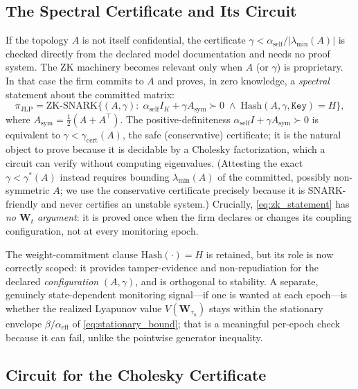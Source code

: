 \documentclass[12pt]{article}
\theoremstyle{plain}
\theoremstyle{definition}
\newcommand{\W}{\mathbf{W}}
\newcommand{\abs}[1]{\left| #1 \right|}
\begin{document}
\subsection{The Spectral Certificate and Its Circuit}

If the topology $A$ is not itself confidential, the certificate
$\gamma<\alpha_{\mathrm{self}}/\abs{\lambda_{\min}(A)}$ is checked directly
from the declared model documentation and needs no proof system.  The ZK
machinery becomes relevant only when $A$ (or $\gamma$) is proprietary.  In
that case the firm commits to $A$ and proves, in zero knowledge, a
\emph{spectral} statement about the committed matrix:
\begin{equation}
  \pi_{\mathrm{JLP}} = \mathrm{ZK\text{-}SNARK}\bigl\{
    (A,\gamma) :\;
    \alpha_{\mathrm{self}} I_K + \gamma A_{\mathrm{sym}} \succ 0
    \;\wedge\;
    \mathrm{Hash}(A,\gamma,\mathtt{Key}) = H
  \bigr\},
  \label{eq:zk_statement}
\end{equation}
where $A_{\mathrm{sym}}=\tfrac12(A+A^\top)$.  The positive-definiteness
$\alpha_{\mathrm{self}} I + \gamma A_{\mathrm{sym}}\succ0$ is equivalent to
$\gamma<\gamma_{\mathrm{cert}}(A)$, the safe (conservative) certificate; it
is the natural object to prove because it is decidable by a Cholesky
factorization, which a circuit can verify without computing eigenvalues.
(Attesting the exact $\gamma<\gamma^*(A)$ instead requires bounding
$\lambda_{\min}(A)$ of the committed, possibly non-symmetric $A$; we use the
conservative certificate precisely because it is SNARK-friendly and never
certifies an unstable system.)  Crucially, \eqref{eq:zk_statement} has
\emph{no $\W_t$ argument}: it is proved once when the firm declares or
changes its coupling configuration, not at every monitoring epoch.

The weight-commitment clause $\mathrm{Hash}(\cdot)=H$ is retained, but its
role is now correctly scoped: it provides tamper-evidence and
non-repudiation for the declared \emph{configuration} $(A,\gamma)$, and is
orthogonal to stability.  A separate, genuinely state-dependent monitoring
signal---if one is wanted at each epoch---is whether the realized Lyapunov
value $V(\W_{\tau_n})$ stays within the stationary envelope
$\beta/\alpha_{\mathrm{eff}}$ of \eqref{eq:stationary_bound}; that is a
meaningful per-epoch check because it can fail, unlike the pointwise
generator inequality.

\subsection{Circuit for the Cholesky Certificate}
\end{document}
